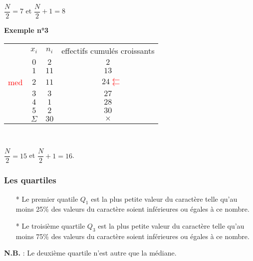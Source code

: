 
\hspace*{.5cm}

$ \dfrac{N}{2} = 7 $ et $ \dfrac{N}{2} + 1 = 8 $ \\

\newpage 

\textbf{Exemple n°3} \\

\begin{tabular}{cc|c|c}
&$x_i$ & $n_i$ & effectifs cumulés croissants \\
\cline{2-4}
 &$0$ & $2$  & $2$  \\
 &$1$ & $11$ & $13$  \\
\textcolor{red}{med} & $2$ & $11$ & 
                      $\quad 24$\textcolor{red}{\Large $\leftleftarrows$}\\
&$3$ & $3$  & $27$ \\
&$4$ & $1$  & $28$ \\
&$5$ & $2$  & $30$ \\
\cline{2-4}
& $\Sigma$ & $30$ & {\Large $\times$} \\ 
\end{tabular} \\


\hspace*{.5cm}

$ \dfrac{N}{2} = 15 $ et $ \dfrac{N}{2} + 1 = 16$. \\

\subsubsection{Les quartiles}

\begin{itemize}
\item[*] Le premier quatile $Q_1$ est la plus petite valeur du caractère telle qu'au moins 25\% des valeurs du caractère soient inférieures ou égales à ce nombre.
\item[*] Le troisième quartile $Q_3$ est la plus petite valeur du caractère telle qu'au moins 75\% des valeurs du caractère soient inférieures ou égales à ce nombre.
\end{itemize}

\vspace*{.3cm}

\textbf{N.B.} : Le deuxième quartile n'est autre que la médiane.

